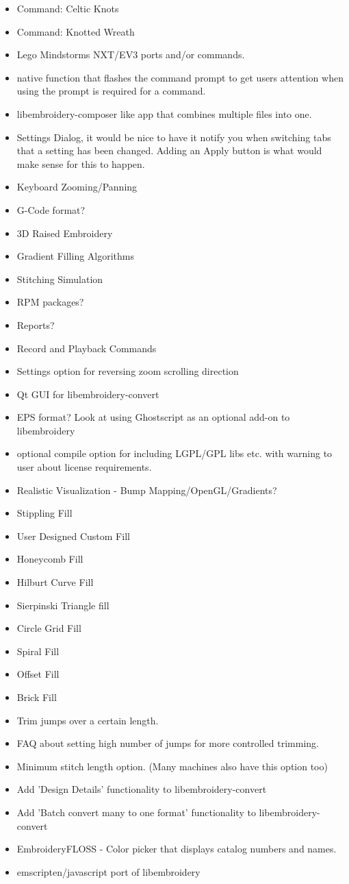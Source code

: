 \documentclass[11pt]{report}
\begin{document}
\begin{itemize}
\item Command: Celtic Knots
\item Command: Knotted Wreath
\item Lego Mindstorms NXT/EV3 ports and/or commands.
\item native function that flashes the command prompt to get users attention when using the
prompt is required for a command.
\item libembroidery-composer like app that combines multiple files into one.
\item Settings Dialog, it would be nice to have it notify you when switching tabs that a
setting has been changed. Adding an Apply button is what would make sense for this to happen.
\item Keyboard Zooming/Panning
\item G-Code format?
\item 3D Raised Embroidery
\item Gradient Filling Algorithms
\item Stitching Simulation
\item RPM packages?
\item Reports?
\item Record and Playback Commands
\item Settings option for reversing zoom scrolling direction
\item Qt GUI for libembroidery-convert
\item EPS format? Look at using Ghostscript as an optional add-on to libembroidery
\item optional compile option for including LGPL/GPL libs etc. with warning to user about license requirements.
\item Realistic Visualization - Bump Mapping/OpenGL/Gradients?
\item Stippling Fill
\item User Designed Custom Fill
\item Honeycomb Fill
\item Hilburt Curve Fill
\item Sierpinski Triangle fill
\item Circle Grid Fill
\item Spiral Fill
\item Offset Fill
\item Brick Fill
\item Trim jumps over a certain length.
\item FAQ about setting high number of jumps for more controlled trimming.
\item Minimum stitch length option. (Many machines also have this option too)
\item Add 'Design Details' functionality to libembroidery-convert
\item Add 'Batch convert many to one format' functionality to libembroidery-convert
\item EmbroideryFLOSS - Color picker that displays catalog numbers and names.
\item emscripten/javascript port of libembroidery
\end{itemize}
\end{document}
